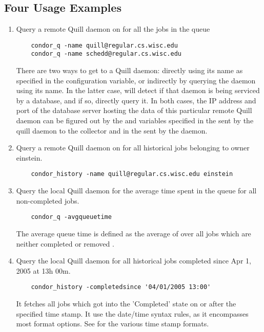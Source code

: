 \subsection{\label{sec:Quill-Example}Four Usage Examples}


\begin{enumerate}
\item Query a remote Quill daemon on 
for all the jobs in the queue
\begin{verbatim}
	condor_q -name quill@regular.cs.wisc.edu
	condor_q -name schedd@regular.cs.wisc.edu

\end{verbatim}
There are two ways to get to a Quill daemon: directly using its name as 
specified in the  configuration variable, or indirectly
by querying the  daemon using its name.
In the latter case,  will detect 
if that  daemon is being serviced by a database, and if so, directly query it.
In both cases, the IP address and port of the database server hosting the data of 
this particular remote Quill daemon can be figured out by the  
and  variables specified in the 
sent by the quill daemon to the collector and in the  sent by
the  daemon.  

\item Query a remote Quill daemon on  for all historical 
jobs belonging to owner einstein.
\begin{verbatim}
	condor_history -name quill@regular.cs.wisc.edu einstein
\end{verbatim}

\item Query the local Quill daemon for the average time spent in the queue 
for all non-completed jobs. 
\begin{verbatim}
	condor_q -avgqueuetime 
\end{verbatim}
The average queue time is defined as the average of
 over all jobs which are neither
completed  or removed .

\item Query the local Quill daemon for all historical jobs completed since 
Apr 1, 2005 at 13h 00m.
\begin{verbatim}
	condor_history -completedsince '04/01/2005 13:00'
\end{verbatim}
It fetches all jobs
which got into the 'Completed' state on or after the
specified time stamp.  It use the  date/time
syntax rules, as it encompasses most format options.  See
for the various time stamp formats.

\end{enumerate}

